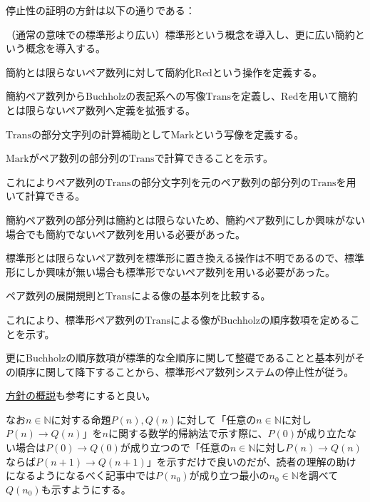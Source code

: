 \documentclass[dvipdfmx,uplatex]{jsarticle}
\newif\iffull
\theoremstyle{customnonumberbreakfortheorem}
\theoremstyle{customnonumberbreakforproof}
\begin{document}
停止性の証明の方針は以下の通りである：
\begin{nenumerate}
	\item （通常の意味での標準形より広い）標準形という概念を導入し、更に広い簡約という概念を導入する。
	\item 簡約とは限らないペア数列に対して簡約化\(\textrm{Red}\)という操作を定義する。
	\item 簡約ペア数列からBuchholzの表記系への写像\(\textrm{Trans}\)を定義し、\(\textrm{Red}\)を用いて簡約とは限らないペア数列へ定義を拡張する。
	\item \(\textrm{Trans}\)の部分文字列の計算補助として\(\textrm{Mark}\)という写像を定義する。
	\item \(\textrm{Mark}\)がペア数列の部分列の\(\textrm{Trans}\)で計算できることを示す。
	\begin{nenumerate}
		\item これによりペア数列の\(\textrm{Trans}\)の部分文字列を元のペア数列の部分列の\(\textrm{Trans}\)を用いて計算できる。
		\item 簡約ペア数列の部分列は簡約とは限らないため、簡約ペア数列にしか興味がない場合でも簡約でないペア数列を用いる必要があった。
		\item 標準形とは限らないペア数列を標準形に置き換える操作は不明であるので、標準形にしか興味が無い場合も標準形でないペア数列を用いる必要があった。
	\end{nenumerate}
	\item ペア数列の展開規則と\(\textrm{Trans}\)による像の基本列を比較する。
	\begin{nenumerate}
		\item これにより、標準形ペア数列の\(\textrm{Trans}\)による像がBuchholzの順序数項を定めることを示す。
		\item 更にBuchholzの順序数項が標準的な全順序に関して整礎であることと基本列がその順序に関して降下することから、標準形ペア数列システムの停止性が従う。
	\end{nenumerate}
\end{nenumerate}
\href{https://googology.wikia.com/wiki/User_blog:P\%E9\%80\%B2\%E5\%A4\%A7\%E5\%A5\%BD\%E3\%81\%8Dbot/Introduction\_to\_the\_Termination\_of\_Pair\_Sequence\_System}{方針の概説}も参考にすると良い。

\iffull

なお\(n \in \mathbb{N}\)に対する命題\(P(n), Q(n)\)に対して「任意の\(n \in \mathbb{N}\)に対し\(P(n) \to Q(n)\)」を\(n\)に関する数学的帰納法で示す際に、\(P(0)\)が成り立たない場合は\(P(0) \to Q(0)\)が成り立つので「任意の\(n \in \mathbb{N}\)に対し\(P(n) \to Q(n)\)ならば\(P(n+1) \to Q(n+1)\)」を示すだけで良いのだが、読者の理解の助けになるようになるべく記事中では\(P(n_0)\)が成り立つ最小の\(n_0 \in \mathbb{N}\)を調べて\(Q(n_0)\)も示すようにする。
\end{document}
